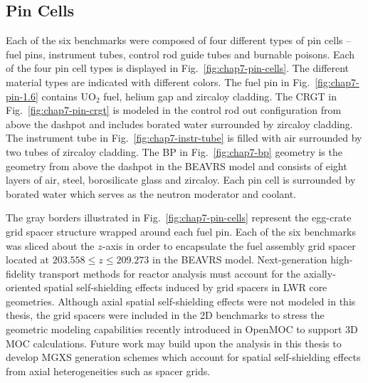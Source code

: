 \subsection{Pin Cells}
\label{subsec:chap7-pin-cells}

Each of the six benchmarks were composed of four different types of pin cells -- fuel pins, instrument tubes, control rod guide tubes and burnable poisons. Each of the four pin cell types is displayed in Fig.~\ref{fig:chap7-pin-cells}. The different material types are indicated with different colors. The fuel pin in Fig.~\ref{fig:chap7-pin-1.6} contains UO$_2$ fuel, helium gap and zircaloy cladding. The \ac{CRGT} in Fig.~\ref{fig:chap7-pin-crgt} is modeled in the control rod out configuration from above the dashpot and includes borated water surrounded by zircaloy cladding. The instrument tube in Fig.~\ref{fig:chap7-instr-tube} is filled with air surrounded by two tubes of zircaloy cladding. The \ac{BP} in Fig.~\ref{fig:chap7-bp} geometry is the geometry from above the dashpot in the \ac{BEAVRS} model and consists of eight layers of air, steel, borosilicate glass and zircaloy. Each pin cell is surrounded by borated water which serves as the neutron moderator and coolant. 

The gray borders illustrated in Fig.~\ref{fig:chap7-pin-cells} represent the egg-crate grid spacer structure wrapped around each fuel pin. Each of the six benchmarks was sliced about the $z$-axis in order to encapsulate the fuel assembly grid spacer located at $203.558 \le z \le 209.273$ in the \ac{BEAVRS} model. Next-generation high-fidelity transport methods for reactor analysis must account for the axially-oriented spatial self-shielding effects induced by grid spacers in \ac{LWR} core geometries. Although axial spatial self-shielding effects were not modeled in this thesis, the grid spacers were included in the 2D benchmarks to stress the geometric modeling capabilities recently introduced in OpenMOC to support 3D \ac{MOC} calculations. Future work may build upon the analysis in this thesis to develop \ac{MGXS} generation schemes which account for spatial self-shielding effects from axial heterogeneities such as spacer grids.

